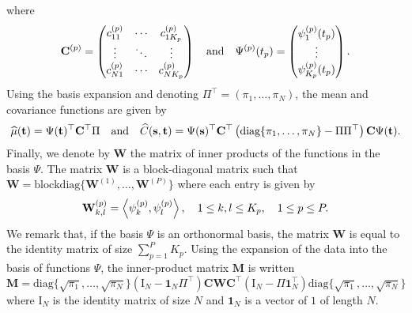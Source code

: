 where
\begin{equation}
\mathbf{C}^{(p)} = \begin{pmatrix}
    c^{(p)}_{11} & \cdots & c^{(p)}_{1K_p} \\
    \vdots & \ddots & \vdots \\
    c^{(p)}_{N1} & \cdots & c^{(p)}_{NK_p}
\end{pmatrix} \\
\quad \text{and}\quad
\Psi^{(p)}(t_p) = \begin{pmatrix}
    \psi_1^{(p)}(t_p) \\
    \vdots \\
    \psi_{K_p}^{(p)}(t_p)
\end{pmatrix}.
\end{equation}
Using the basis expansion and denoting $\Pi^\top = (\pi_1, \dots, \pi_N)$, the mean and covariance functions are given by
\begin{equation}
    \widehat{\mu}(\mathbf{t}) = \Psi(\mathbf{t})^\top \mathbf{C}^\top\Pi \quad\text{and}\quad \widehat{C}(\mathbf{s}, \mathbf{t}) = \Psi(\mathbf{s})^\top \mathbf{C}^\top \left(\text{diag}\{
        \pi_1, \dots, \pi_N\} - \Pi\Pi^\top\right)\mathbf{C} \Psi(\mathbf{t}).
\end{equation}
Finally, we denote by $\mathbf{W}$ the matrix of inner products of the functions in the basis $\Psi$. The matrix $\mathbf{W}$ is a block-diagonal matrix such that $\mathbf{W} = \text{blockdiag}\{\mathbf{W}^{(1)}, \dots, \mathbf{W}^{(P)}\}$ where each entry is given by
\begin{equation}
    \mathbf{W}_{k, l}^{(p)} = \left\langle\psi_k^{(p)}, \psi_l^{(p)}\right\rangle, \quad 1 \leq k, l \leq K_p, \quad 1 \leq p \leq P.
\end{equation}
We remark that, if the basis $\Psi$ is an orthonormal basis, the matrix $\mathbf{W}$ is equal to the identity matrix of size $\sum_{p = 1}^P K_p$.
Using the expansion of the data into the basis of functions $\Psi$, the inner-product matrix $\mathbf{M}$ is written 
\begin{equation}\label{eq:gram_matrix_basis}
    \mathbf{M} = \text{diag}\{
        \sqrt{\pi_1}, \dots, \sqrt{\pi_N}\}\left(\mathrm{I}_{\!N} - \mathbf{1}_{\!N}\Pi^\top\right) \mathbf{C} \mathbf{W} \mathbf{C}^\top \left(\mathrm{I}_{\!N} - \Pi\mathbf{1}_{\!N}^\top\right)\text{diag}\{
        \sqrt{\pi_1}, \dots, \sqrt{\pi_N}\}
\end{equation}
where $\mathrm{I}_{\!N}$ is the identity matrix of size $N$ and $\mathbf{1}_{\!N}$ is a vector of $1$ of length $N$.


